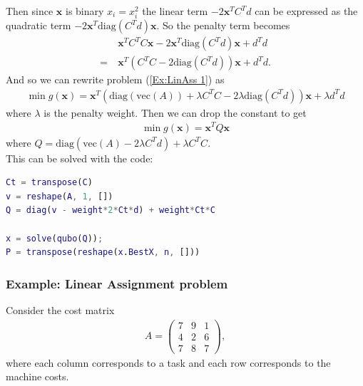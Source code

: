 \documentclass{article}
\begin{document}
\noindent Then since \(\mathbf{x}\) is binary \(x_i = x_i^2\) the linear term \(-2\mathbf{x}^T C^T d\) can be expressed as the quadratic term \(-2\mathbf{x}^T\text{diag}(C^Td)\mathbf{x}\). So the penalty term becomes
\begin{align}
    &\mathbf{x}^T C^T C \mathbf{x} -2\mathbf{x}^T\text{diag}(C^Td)\mathbf{x} + d^Td \nonumber \\
    = \: &\mathbf{x}^T(C^T C -2\text{diag}(C^Td))\mathbf{x} + d^Td. \label{penalty:CX}
\end{align}
And so we can rewrite problem (\ref{Ex:LinAss 1}) as 
\begin{align*}
    \min g(\mathbf{x}) = \mathbf{x}^T (\text{diag}(\text{vec}(A)) + \lambda C^T C - 2\lambda\text{diag}(C^T d))\mathbf{x} + \lambda d^Td
\end{align*}
where \(\lambda\) is the penalty weight. Then we can drop the constant to get
\begin{align*}
    \min g(\mathbf{x}) = \mathbf{x}^T Q \mathbf{x}
\end{align*}
where \(Q = \text{diag}(\text{vec}(A) - 2\lambda C^Td) + \lambda C^T C\).\\

\noindent This can be solved with the code:
\begin{lstlisting}[language=MATLAB]
Ct = transpose(C)
v = reshape(A, 1, [])
Q = diag(v - weight*2*Ct*d) + weight*Ct*C

x = solve(qubo(Q));
P = transpose(reshape(x.BestX, n, []))
\end{lstlisting}

\subsubsection{Example: Linear Assignment problem}

Consider the cost matrix \begin{align*}
    A = \begin{pmatrix}
        7 & 9 & 1\\
        4 & 2 & 6\\
        7 & 8 & 7
    \end{pmatrix},
\end{align*}
where each column corresponds to a task and each row corresponds to the machine costs.
\end{document}
